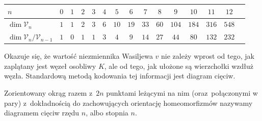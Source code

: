 \renewcommand*{\arraystretch}{1.4}
\footnotesize
\begin{longtable}{lcccccccccccccc}
\hline
    $n$ & $0$ & $1$ & $2$ & $3$ & $4$ & $5$ & $6$ & $7$ & $8$ & $9$ & $10$ & $11$ & $12$ \\ \hline \endhead
    $\dim \mathcal V_n$ & $1$ & $1$ & $2$ & $3$ & $6$ & $10$ & $19$ & $33$ & $60$ & $104$ & $184$ & $316$ & $548$ \\
    $\dim \mathcal V_n / \mathcal V_{n-1}$ & $1$ & $0$ & $1$ & $1$ & $3$ & $4$ & $9$ & $14$ & $27$ & $44$ & $80$ & $132$ & $232$ \\
    \hline
\end{longtable}
\normalsize


Okazuje się, że wartość niezmiennika Wasiljewa $v$ nie zależy wprost od tego, jak zaplątany jest węzeł osobliwy $K$, ale od tego, jak ułożone są wierzchołki wzdłuż węzła. Standardową metodą kodowania tej informacji jest diagram cięciw.

\begin{definition}
%
    Zorientowany okrąg razem z~$2n$ punktami leżącymi na nim (oraz~połączonymi w pary) z~dokładnością do zachowujących orientację homeomorfizmów nazywamy diagramem cięciw rzędu $n$, albo stopnia $n$.
\end{definition}

